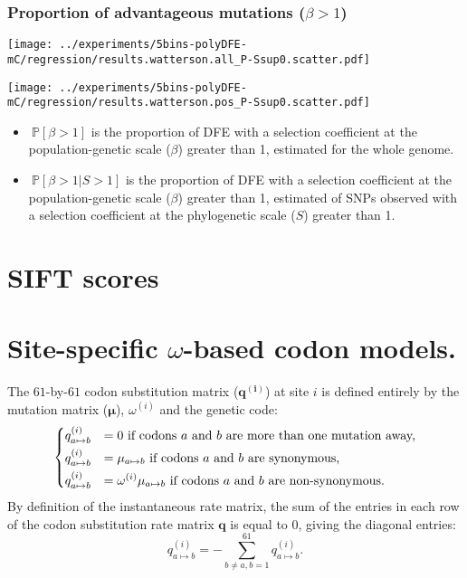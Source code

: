 \documentclass{article}
\newcommand{\UniDimArray}[1]{\bm{#1}}
\newcommand{\proba}{\mathbb{P}}
\newcommand{\Sphy}{S}
\newcommand{\divAdv}{ \Sphy > 1}
\newcommand{\Spop}{\beta}
\newcommand{\polyAdv}{ \Spop > 1}
\begin{document}
    \subsubsection{Proportion of advantageous mutations ($\polyAdv$)}

    \begin{minipage}{0.32\linewidth}
        \texttt{[image: ../experiments/5bins-polyDFE-mC/regression/results.watterson.all\_P-Ssup0.scatter.pdf]}
    \end{minipage}
    \begin{minipage}{0.32\linewidth}
        \texttt{[image: ../experiments/5bins-polyDFE-mC/regression/results.watterson.pos\_P-Ssup0.scatter.pdf]}
    \end{minipage}

    \begin{itemize}
        \item $\ \proba [ \polyAdv  ]$ is the proportion of DFE with a selection coefficient at the population-genetic scale ($\Spop$) greater than 1, estimated for the whole genome.
        \item $\ \proba [ \polyAdv | \divAdv] $ is the proportion of DFE with a selection coefficient at the population-genetic scale ($\Spop$) greater than 1, estimated of SNPs observed with a selection coefficient at the phylogenetic scale ($\Sphy$) greater than 1.
    \end{itemize}


    


    \section{SIFT scores}
    


    \section{Site-specific $\omega$-based codon models.}
    The $61$-by-$61$ codon substitution matrix ($\UniDimArray{q^{(i)}}$) at site $i$ is defined entirely by the mutation matrix ($\UniDimArray{\mu}$), $\omega^{(i)}$ and the genetic code:
    \begin{equation}
        \begin{dcases}
            q_{a \mapsto b}^{(i)} & = 0 \text{ if codons $a$ and $b$ are more than one mutation away,} \\
            q_{a \mapsto b}^{(i)} & = \mu_{a \mapsto b} \text{ if codons $a$ and $b$ are synonymous,} \\
            q_{a \mapsto b}^{(i)} & = \omega^{(i)} \mu_{a \mapsto b} \text{ if codons $a$ and $b$ are non-synonymous}.
        \end{dcases}
    \end{equation}
    By definition of the instantaneous rate matrix, the sum of the entries in each row of the codon substitution rate matrix $\UniDimArray{q}$ is equal to $0$, giving the diagonal entries:
    \begin{equation}
        q_{a \mapsto b}^{(i)}= - \sum\limits_{b \neq a, b = 1}^{61} q_{a \mapsto b}^{(i)}.
    \end{equation}
\end{document}

